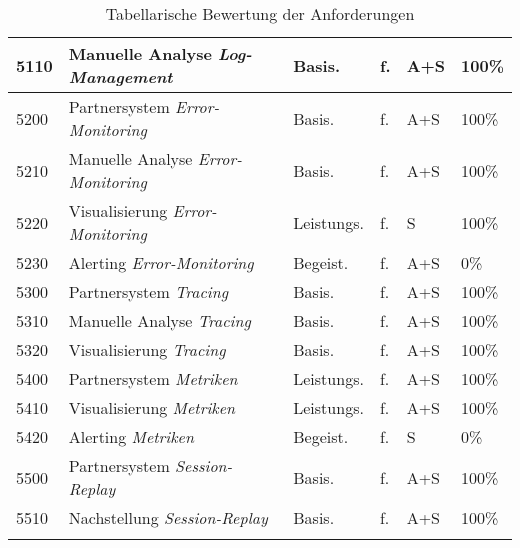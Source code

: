 \begin{longtable}{|p{0.85cm}|p{6.2cm}|p{1.55cm}|p{1.75cm}|p{1.1cm}|p{1.8cm}|}
\hline
5110 & Manuelle Analyse \textit{Log-Management} & Basis. & f. & A+S & 100\% \\
\hline
5200 & Partnersystem \textit{Error-Monitoring} & Basis. & f. & A+S & 100\% \\
\hline
5210 & Manuelle Analyse \textit{Error-Monitoring} & Basis. & f. & A+S & 100\% \\
\hline
5220 & Visualisierung \textit{Error-Monitoring} & Leistungs. & f. & S & 100\% \\
\hline
5230 & Alerting  \textit{Error-Monitoring} & Begeist. & f. & A+S & 0\% \\
\hline
5300 & Partnersystem \textit{Tracing} & Basis. & f. & A+S & 100\% \\
\hline
5310 & Manuelle Analyse \textit{Tracing} & Basis. & f. & A+S & 100\% \\
\hline
5320 & Visualisierung \textit{Tracing} & Basis. & f. & A+S & 100\% \\
\hline
5400 & Partnersystem \textit{Metriken} & Leistungs. & f. & A+S & 100\% \\
\hline
5410 & Visualisierung \textit{Metriken} & Leistungs. & f. & A+S & 100\% \\
\hline
5420 & Alerting \textit{Metriken} & Begeist. & f. & S & 0\% \\
\hline
5500 & Partnersystem \textit{Session-Replay} & Basis. & f. & A+S & 100\% \\
\hline
5510 & Nachstellung \textit{Session-Replay} & Basis. & f. & A+S & 100\% \\
\hline
\caption{Tabellarische Bewertung der Anforderungen}
\label{tab:anforderungsbewertung}
\end{longtable}
\endgroup

